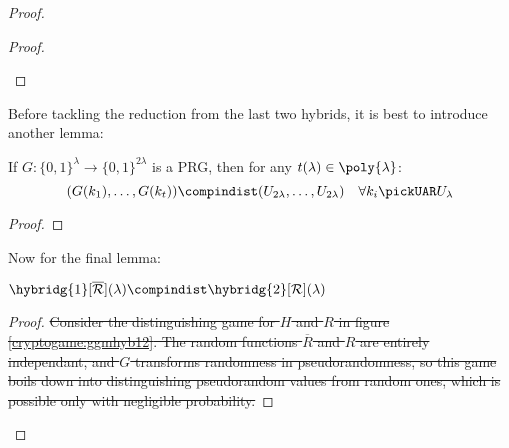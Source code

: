 \begin{proof}
\begin{proof}
\begin{cryptoredux}






        \end{cryptoredux}

    \end{proof}

    Before tackling the reduction from the last two hybrids, it is best to introduce another lemma:

    \begin{lemma}
        If $G : \{0, 1\}^\lambda \to \{0, 1\}^{2\lambda}$ is a PRG, then for any $t(\lambda) \in \poly{\lambda}$:
        \[
            (G(k_1), \dots , G(k_t)) \compindist (U_{2\lambda}, \dots , U_{2\lambda}) \quad \forall k_i \pickUAR U_\lambda
        \]
    \end{lemma}

    \begin{proof}
    \end{proof}

    Now for the final lemma:

    \begin{lemma}
        $\hybridg{1}[\overline{\R}](\lambda) \compindist \hybridg{2}[\R](\lambda)$       
    \end{lemma}
    
    \begin{proof}
        
        
        \sout{Consider the distinguishing game for $H$ and $R$ in figure \ref{cryptogame:ggmhyb12}. The random functions $\overline{R}$ and $R$ are entirely independant, and $G$ transforms randomness in pseudorandomness, so this game boils down into distinguishing pseudorandom values from random ones, which is possible only with negligible probability.}
        

\end{proof}
\end{proof}
